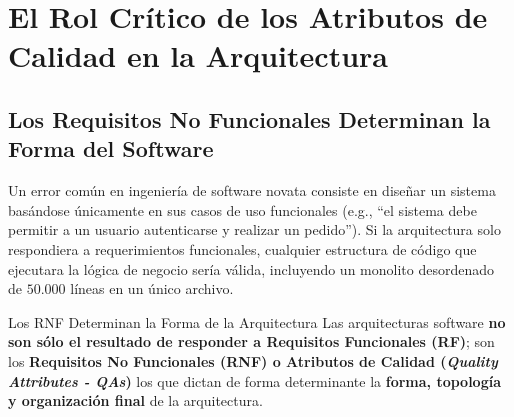 \vspace{1em}

\section{El Rol Crítico de los Atributos de Calidad en la Arquitectura}
\label{sec:atributos-calidad-rol}

\subsection{Los Requisitos No Funcionales Determinan la Forma del Software}

Un error común en ingeniería de software novata consiste en diseñar un sistema basándose únicamente en sus casos de uso funcionales (e.g., ``el sistema debe permitir a un usuario autenticarse y realizar un pedido''). Si la arquitectura solo respondiera a requerimientos funcionales, cualquier estructura de código que ejecutara la lógica de negocio sería válida, incluyendo un monolito desordenado de $50.000$ líneas en un único archivo.

\begin{principio}{Los RNF Determinan la Forma de la Arquitectura}
Las arquitecturas software \textbf{no son sólo el resultado de responder a Requisitos Funcionales (RF)}; son los \textbf{Requisitos No Funcionales (RNF) o Atributos de Calidad (\emph{Quality Attributes - QAs})} los que dictan de forma determinante la \textbf{forma, topología y organización final} de la arquitectura.
\end{principio}

